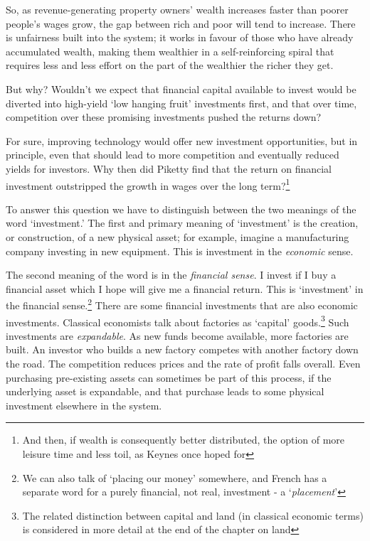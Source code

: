\documentclass[]{tufte-handout}
\begin{document}
So, as revenue-generating property owners' wealth increases faster than
poorer people's wages grow, the gap between rich and poor will tend to
increase. There is unfairness built into the system; it works in favour
of those who have already accumulated wealth, making them wealthier in a
self-reinforcing spiral that requires less and less effort on the part
of the wealthier the richer they get.

But why? Wouldn't we expect that financial capital available to invest
would be diverted into high-yield `low hanging fruit' investments first,
and that over time, competition over these promising investments pushed
the returns down?

For sure, improving technology would offer new investment opportunities,
but in principle, even that should lead to more competition and
eventually reduced yields for investors. Why then did Piketty find that
the return on financial investment outstripped the growth in wages over
the long term?\footnote{And then, if wealth is consequently better
  distributed, the option of more leisure time and less toil, as Keynes
  once hoped for}

To answer this question we have to distinguish between the two meanings
of the word `investment.' The first and primary meaning of `investment'
is the creation, or construction, of a new physical asset; for example,
imagine a manufacturing company investing in new equipment. This is
investment in the \emph{economic} sense.

The second meaning of the word is in the \emph{financial sense}. I
invest if I buy a financial asset which I hope will give me a financial
return. This is `investment' in the financial sense.\footnote{We can
  also talk of `placing our money' somewhere, and French has a separate
  word for a purely financial, not real, investment - a
  `\emph{placement}'} There are some financial investments that are also
economic investments. Classical economists talk about factories as
`capital' goods.\footnote{The related distinction between capital and
  land (in classical economic terms) is considered in more detail at the
  end of the chapter on land} Such investments are \emph{expandable}. As
new funds become available, more factories are built. An investor who
builds a new factory competes with another factory down the road. The
competition reduces prices and the rate of profit falls overall. Even
purchasing pre-existing assets can sometimes be part of this process, if
the underlying asset is expandable, and that purchase leads to some
physical investment elsewhere in the system.
\end{document}
